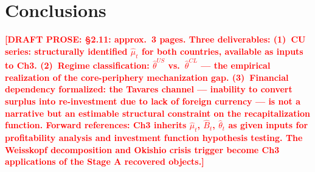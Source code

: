 \documentclass[12pt,letterpaper]{article}
\newcommand{\draftnote}[1]{%
  \textcolor{red}{\textbf{[DRAFT PROSE: #1]}}}
\begin{document}
\section{Conclusions}
\label{sec:conclusions}

\draftnote{§2.11: approx.\ 3 pages. Three deliverables:
  (1)~CU series: structurally identified $\hat{\mu}_t$ for both countries,
  available as inputs to Ch3.
  (2)~Regime classification: $\hat{\theta}^{US}$ vs.\ $\hat{\theta}^{CL}$
  — the empirical realization of the core-periphery mechanization gap.
  (3)~Financial dependency formalized: the Tavares channel — inability to
  convert surplus into re-investment due to lack of foreign currency —
  is not a narrative but an estimable structural constraint on the
  recapitalization function.
  Forward references: Ch3 inherits $\hat{\mu}_t$, $\hat{B}_t$, $\hat{\theta}_t$
  as given inputs for profitability analysis and investment function
  hypothesis testing. The Weisskopf decomposition and Okishio crisis
  trigger become Ch3 applications of the Stage A recovered objects.}





%
\end{document}
